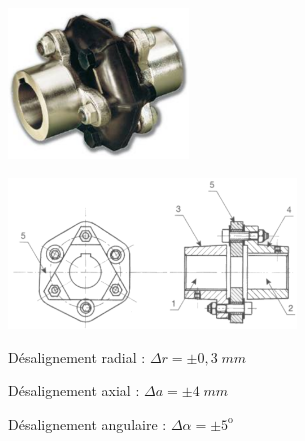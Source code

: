 \documentclass[11pt,oneside]{article}
\begin{document}
\noindent\begin{minipage}[c]{.25\linewidth}
\begin{center}
\includegraphics[height=4cm]{png/fig_11}
\end{center}
\end{minipage} \hfill
\begin{minipage}[c]{.4\linewidth}
\begin{center}
\includegraphics[height=4cm]{png/fig_12}
\end{center}
\end{minipage}\hfill
\begin{minipage}[c]{.3\linewidth}
Désalignement radial : 
$\Delta r = \pm 0,3\; mm$

Désalignement axial : 
$\Delta a = \pm 4\; mm$

Désalignement angulaire : 
$\Delta \alpha = \pm 5^\text{o}$
\end{minipage}
\end{document}
